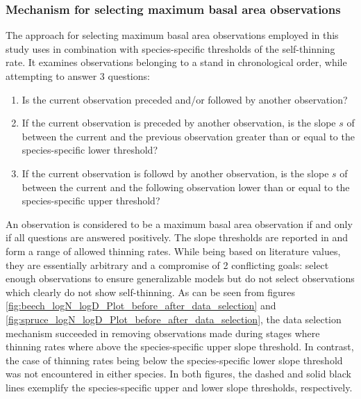 \subsubsection{Mechanism for selecting maximum basal area observations}

The approach for selecting maximum basal area observations employed in this study uses  in combination with species-specific thresholds of the self-thinning rate.  It examines observations belonging to a stand in chronological order, while attempting to answer 3 questions:
\begin{enumerate}
\item Is the current observation preceded and/or followed by another observation?
\item If the current observation is preceded by another observation, is the slope \(s\) of  between the current and the previous observation greater than or equal to the species-specific lower threshold?
\item If the current observation is followd by another observation, is the slope \(s\) of  between the current and the following observation lower than or equal to the species-specific upper threshold?
\end{enumerate}
An observation is considered to be a maximum basal area observation if and only if all questions are answered positively.
The slope thresholds are reported in  and form a range of allowed thinning rates.  While being based on literature values, they are essentially arbitrary and a compromise of 2 conflicting goals: select enough observations to ensure generalizable models but do not select observations which clearly do not show self-thinning.
As can be seen from figures \ref{fig:beech_logN_logD_Plot_before_after_data_selection} and \ref{fig:spruce_logN_logD_Plot_before_after_data_selection}, the data selection mechanism succeeded in removing observations made during stages where thinning rates where above the species-specific upper slope threshold.
In contrast, the case of thinning rates being below the species-specific lower slope threshold was not encountered in either species.  In both figures, the dashed and solid black lines exemplify the species-specific upper and lower slope thresholds, respectively.

